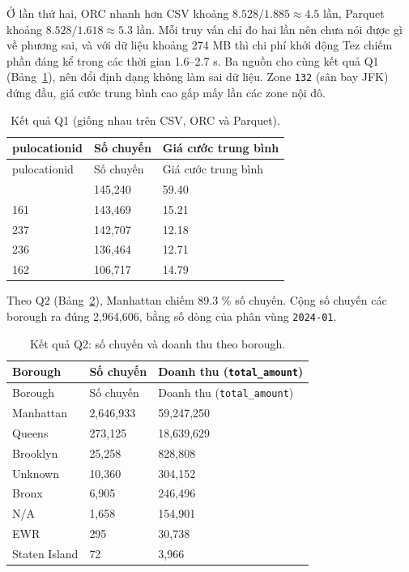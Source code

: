 \documentclass[
  12pt,
  a4paper,
]{article}
\begin{document}
Ở lần thứ hai, ORC nhanh hơn CSV khoảng \(8.528/1.885 \approx 4.5\) lần,
Parquet khoảng \(8.528/1.618 \approx 5.3\) lần. Mỗi truy vấn chỉ đo hai
lần nên chưa nói được gì về phương sai, và với dữ liệu khoảng 274 MB thì
chi phí khởi động Tez chiếm phần đáng kể trong các thời gian 1.6--2.7 s.
Ba nguồn cho cùng kết quả Q1 (Bảng~\ref{tbl:l03-q1}), nên đổi định dạng
không làm sai dữ liệu. Zone \texttt{132} (sân bay JFK) đứng đầu, giá
cước trung bình cao gấp mấy lần các zone nội đô.

\begin{longtable}[]{@{}lll@{}}
\caption{\label{tbl:l03-q1}Kết quả Q1 (giống nhau trên CSV, ORC và
Parquet).}\tabularnewline
\toprule\noalign{}
pulocationid & Số chuyến & Giá cước trung bình \\
\midrule\noalign{}
\endfirsthead
\toprule\noalign{}
pulocationid & Số chuyến & Giá cước trung bình \\
\midrule\noalign{}
\endhead
\bottomrule\noalign{}
\endlastfoot
132 & 145,240 & 59.40 \\
161 & 143,469 & 15.21 \\
237 & 142,707 & 12.18 \\
236 & 136,464 & 12.71 \\
162 & 106,717 & 14.79 \\
\end{longtable}

Theo Q2 (Bảng~\ref{tbl:l03-q2}), Manhattan chiếm 89.3 \% số chuyến. Cộng
số chuyến các borough ra đúng 2,964,606, bằng số dòng của phân vùng
\texttt{2024-01}.

\begin{longtable}[]{@{}lll@{}}
\caption{\label{tbl:l03-q2}Kết quả Q2: số chuyến và doanh thu theo
borough.}\tabularnewline
\toprule\noalign{}
Borough & Số chuyến & Doanh thu (\texttt{total\_amount}) \\
\midrule\noalign{}
\endfirsthead
\toprule\noalign{}
Borough & Số chuyến & Doanh thu (\texttt{total\_amount}) \\
\midrule\noalign{}
\endhead
\bottomrule\noalign{}
\endlastfoot
Manhattan & 2,646,933 & 59,247,250 \\
Queens & 273,125 & 18,639,629 \\
Brooklyn & 25,258 & 828,808 \\
Unknown & 10,360 & 304,152 \\
Bronx & 6,905 & 246,496 \\
N/A & 1,658 & 154,901 \\
EWR & 295 & 30,738 \\
Staten Island & 72 & 3,966 \\
\end{longtable}
\end{document}
